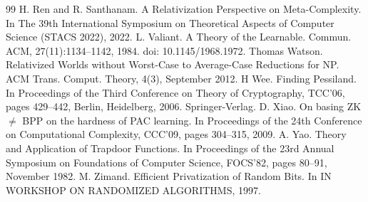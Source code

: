 \begin{thebibliography}{99}
 H. Ren and R. Santhanam. A Relativization Perspective on Meta-Complexity. In The 39th International Symposium on Theoretical Aspects of Computer Science (STACS 2022), 2022.
 L. Valiant. A Theory of the Learnable. Commun. ACM, 27(11):1134–1142, 1984. doi: 10.1145/1968.1972.
 Thomas Watson. Relativized Worlds without Worst-Case to Average-Case Reductions for NP. ACM Trans. Comput. Theory, 4(3), September 2012.
 H Wee. Finding Pessiland. In Proceedings of the Third Conference on Theory of Cryptography, TCC’06, pages 429–442, Berlin, Heidelberg, 2006. Springer-Verlag.
 D. Xiao. On basing ZK $\neq$ BPP on the hardness of PAC learning. In Proceedings of the 24th Conference on Computational Complexity, CCC’09, pages 304–315, 2009.
 A. Yao. Theory and Application of Trapdoor Functions. In Proceedings of the 23rd Annual Symposium on Foundations of Computer Science, FOCS’82, pages 80–91, November 1982.
 M. Zimand. Efficient Privatization of Random Bits. In IN WORKSHOP ON RANDOMIZED ALGORITHMS, 1997.
\end{thebibliography}
